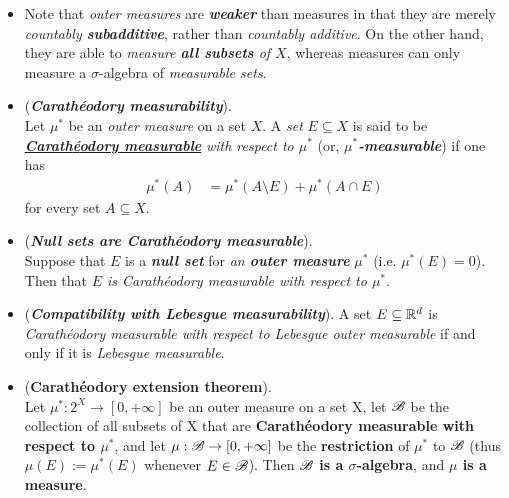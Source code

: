 \documentclass[11pt]{article}
\begin{document}
\begin{itemize}
\item \begin{remark}
Note that \emph{outer measures} are \emph{\textbf{weaker}} than measures in that they are merely \emph{countably \textbf{subadditive}}, rather than \emph{countably additive}. On the other hand, they are able to \emph{measure \textbf{all subsets} of $X$}, whereas measures can only measure a $\sigma$-algebra of \emph{measurable sets}.
\end{remark}


\item \begin{definition} (\emph{\textbf{Carath{\'e}odory measurability}}).\\
Let $\mu^{*}$ be an \emph{outer measure} on a set $X$. A \emph{set} $E \subseteq X$ is said to be \underline{\emph{\textbf{Carath{\'e}odory measurable}}} \emph{with respect to $\mu^{*}$}  (or, \emph{\textbf{$\mu^{*}$-measurable}}) if one has
\begin{align*}
\mu^{*}(A) &= \mu^{*}(A \setminus E) + \mu^{*}(A \cap E)
\end{align*} for every set $A \subseteq X$.
\end{definition}

\item \begin{example} (\emph{\textbf{Null sets are Carath{\'e}odory measurable}}). \\
Suppose that $E$ is a \emph{\textbf{null set}} for \emph{an \textbf{outer measure}} $\mu^{*}$  (i.e. $\mu^{*}(E) = 0$).  Then 
that \emph{$E$ is Carath{\'e}odory measurable with respect to $\mu^{*}$}.
\end{example}

\item \begin{example} (\emph{\textbf{Compatibility with Lebesgue measurability}}). 
A set $E \subseteq {\mathbb R}^d$ is \emph{Carath\'eodory measurable with respect to Lebesgue outer measurable} if and only if it is \emph{Lebesgue measurable}.
\end{example}

\item \begin{theorem} (\textbf{Carath\'eodory extension theorem}). \citep{tao2011introduction} \\
Let $\mu^{*}: 2^X \rightarrow [0, +\infty]$ be an outer measure on a set X, let ${\mathscr B}$ be the collection of all subsets of X that are \textbf{Carath\'eodory measurable with respect to $\mu^{*}$}, and let $\mu: {\mathscr B} \rightarrow [0, +\infty]$ be the \textbf{restriction} of $\mu^{*}$ to ${\mathscr B}$ (thus $\mu(E) := \mu^{*}(E)$
whenever $E \in {\mathscr B}$). Then \textbf{${\mathscr B}$ is a $\sigma$-algebra}, and \textbf{$\mu$ is a measure}.
\end{theorem}


\end{itemize}
\end{document}
